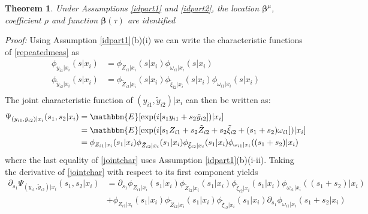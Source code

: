 \documentclass[11pt]{article}
\newtheorem{theorem}{Theorem}[section]
\begin{document}
\begin{theorem}
Under Assumptions \ref{idpart1} and \ref{idpart2}, the location $\boldsymbol{\beta}^{\mu}$, coefficient $\rho$ and function $\boldsymbol{\beta}(\tau)$ are identified
\end{theorem}
\textit{Proof:}
Using Assumption \ref{idpart1}(b)(i) we can write the characteristic functions of \eqref{repeatedmeas} as
\begin{equation} \label{repchar}
\begin{split}
\phi_{y_{i1}|x_{i}}(s|x_{i})&=\phi_{Z_{i1}|x_{i}}(s|x_{i})\phi_{\omega_{i1}|x_{i}}(s|x_{i})\\
\phi_{\tilde{y}_{i2}|x_{i}}(s|x_{i})&=\phi_{\tilde{Z}_{i2}|x_{i}}(s|x_{i})\phi_{\tilde{\xi}_{i2}|x_{i}}(s|x_{i})\phi_{\omega_{i1}|x_{i}}(s|x_{i})\\
\end{split}
\end{equation}
The joint characteristic function of $(y_{i1}, \tilde{y}_{i2})|x_{i}$ can then be written as:
\begin{equation} \label{jointchar}
\begin{split}
\Psi_{(y_{i1}, \tilde{y}_{i2})|x_{i}}(s_{1}, s_{2}|x_{i})&=\mathbbm{E}[\exp(i[s_{1}y_{i1}+s_{2}\tilde{y}_{i2}])|x_{i}]\\
&=\mathbbm{E}[\exp(i[s_{1}Z_{i1}+s_{2}\tilde{Z}_{i2}+s_{2}\tilde{\xi}_{i2}+(s_{1}+s_{2})\omega_{i1}])|x_{i}]\\
&=\phi_{Z_{i1}|x_{i}}(s_{1}|x_{i})\phi_{\tilde{Z}_{i2}|x_{i}}(s_{1}|x_{i})\phi_{\tilde{\xi}_{i2}|x_{i}}(s_{1}|x_{i})\phi_{\omega_{i1}|x_{i}}((s_{1}+s_{2})|x_{i})
\end{split}
\end{equation}
where the last equality of \eqref{jointchar} uses Assumption \ref{idpart1}(b)(i-ii). Taking the derivative of \eqref{jointchar} with respect to its first component yields
\begin{equation*}
\begin{split}
\partial_{s_{1}}\Psi_{(y_{i1}, \tilde{y}_{i2})|x_{i}}(s_{1}, s_{2}|x_{i})&=\partial_{s_{1}}\phi_{Z_{i1}|x_{i}}(s_{1}|x_{i})\phi_{\tilde{Z}_{i2}|x_{i}}(s_{1}|x_{i})\phi_{\tilde{\xi}_{i2}|x_{i}}(s_{1}|x_{i})\phi_{\omega_{i1}|x_{i}}((s_{1}+s_{2})|x_{i})\\
&+\phi_{Z_{i1}|x_{i}}(s_{1}|x_{i})\phi_{\tilde{Z}_{i2}|x_{i}}(s_{1}|x_{i})\phi_{\tilde{\xi}_{i2}|x_{i}}(s_{1}|x_{i})\partial_{s_{1}}\phi_{\omega_{i1}|x_{i}}(s_{1}+s_{2}|x_{i})
\end{split}
\end{equation*}
\end{document}
